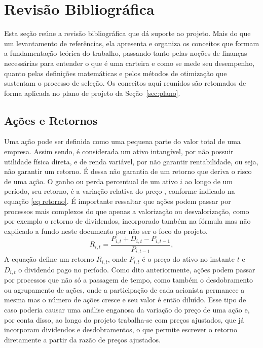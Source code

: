 \documentclass[12pt,a4paper]{article}
\begin{document}
\section{Revisão Bibliográfica}
\label{sec:fundamentacao}
Esta seção reúne a revisão bibliográfica que dá suporte ao projeto. Mais do que um levantamento de referências, ela apresenta e organiza os conceitos que formam a fundamentação teórica do trabalho, passando tanto pelas noções de finanças necessárias para entender o que é uma carteira e como se mede seu desempenho, quanto pelas definições matemáticas e pelos métodos de otimização que sustentam o processo de seleção. Os conceitos aqui reunidos são retomados de forma aplicada no plano de projeto da Seção~\ref{sec:plano}.

\subsection{Ações e Retornos}

Uma ação pode ser definida como uma pequena parte do valor total de uma empresa. Assim sendo, é considerada um ativo intangível, por não possuir utilidade física direta, e de renda variável, por não garantir rentabilidade, ou seja, não garantir um retorno. É dessa não garantia de um retorno que deriva o risco de uma ação. O ganho ou perda percentual de um ativo $i$ ao longo de um período, seu retorno, é a variação relativa do preço \cite{markowitz1952portfolio}, conforme indicado na equação \ref{eq retorno}. É importante ressaltar que ações podem passar por processos mais complexos do que apenas a valorização ou desvalorização, como por exemplo o retorno de dividendos, incorporado também na fórmula mas não explicado a fundo neste documento por não ser o foco do projeto.
\begin{equation}
\label{eq retorno}
R_{i,t} = \frac{P_{i,t} + D_{i,t} - P_{i,t-1}}{P_{i,t-1}},
\end{equation}
A equação define um retorno $R_{i,t}$, onde $P_{i,t}$ é o preço do ativo no instante $t$ e $D_{i,t}$ o dividendo pago no período. Como dito anteriormente, ações podem passar por processos que não só a passagem de tempo, como também o desdobramento ou agrupamento de ações, onde a participação de cada acionista permanece a mesma mas o número de ações cresce e seu valor é então diluído. Esse tipo de caso poderia causar uma análise enganosa da variação do preço de uma ação e, por conta disso, ao longo do projeto trabalha-se com preços ajustados, que já incorporam dividendos e desdobramentos, o que permite escrever o retorno diretamente a partir da razão de preços ajustados. 
\end{document}

